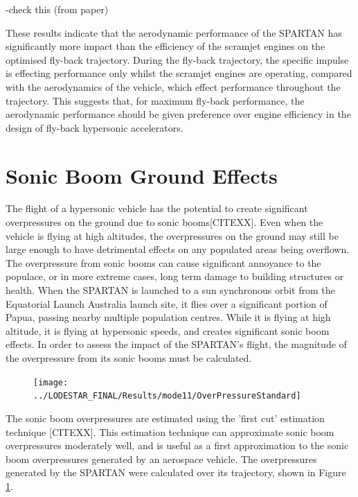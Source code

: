 -check this (from paper)

These results indicate that the aerodynamic performance of the SPARTAN has significantly more impact than the efficiency of the scramjet engines on the optimised fly-back trajectory. During the fly-back trajectory, the specific impulse is effecting performance only whilst the scramjet engines are operating, compared with the aerodynamics of the vehicle, which effect performance throughout the trajectory. This suggests that, for maximum fly-back performance, the aerodynamic performance should be given preference over engine efficiency in the design of fly-back hypersonic accelerators. 





\section{Sonic Boom Ground Effects}

The flight of a hypersonic vehicle has the potential to create significant overpressures on the ground due to sonic booms[CITEXX]. Even when the vehicle is flying at high altitudes, the overpressures on the ground may still be large enough to have detrimental effects on any populated areas being overflown. The overpressure from sonic booms can cause significant annoyance to the populace, or in more extreme cases, long term damage to building structures or health. 
When the SPARTAN is launched to a sun synchronous orbit from the Equatorial Launch Australia launch site, it flies over a significant portion of Papua, passing nearby multiple population centres. While it is flying at high altitude, it is flying at hypersonic speeds, and creates significant sonic boom effects. In order to assess the impact of the SPARTAN's flight, the magnitude of the overpressure from its sonic booms must be calculated. 
\begin{figure}[ht]
	\centering
	\texttt{[image: ../LODESTAR\_FINAL/Results/mode11/OverPressureStandard]}
	\caption{}
	\label{fig:OverPressureStandard}
\end{figure}

The sonic boom overpressures are estimated using the 'first cut' estimation technique [CITEXX]. This estimation technique can approximate sonic boom overpressures moderately well, and is useful as a first approximation to the sonic boom overpressures generated by an aerospace vehicle. The overpressures generated by the SPARTAN were calculated over its trajectory, shown in Figure \ref{fig:OverPressureStandard}. 

